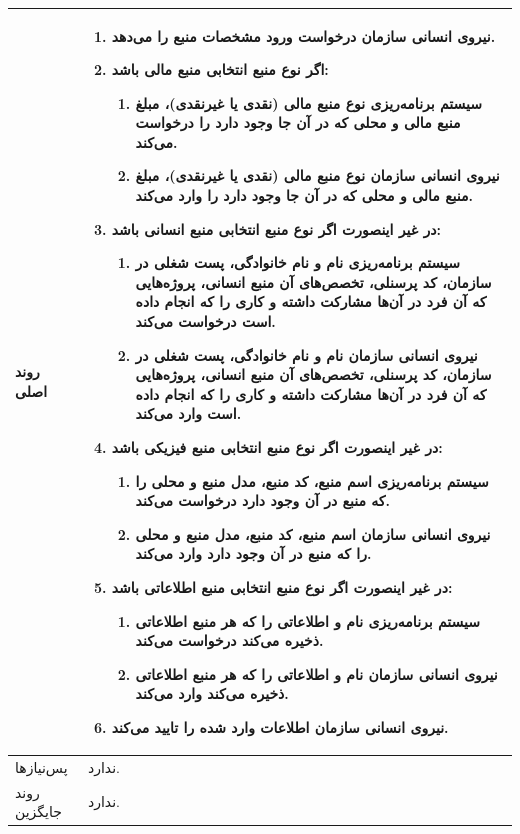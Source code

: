 \begin{table}[H]
\begin{tabular}{|p{3cm}|p{11cm}|}
		
		روند اصلی &
		\begin{enumerate}[topsep=0cm,leftmargin=0.5cm]
			\item نیروی انسانی سازمان درخواست ورود مشخصات منبع را می‌دهد.
			\item اگر نوع منبع انتخابی منبع مالی باشد:
			\begin{enumerate}[topsep=0cm,leftmargin=0.5cm]
				\item سیستم برنامه‌ریزی نوع منبع مالی (نقدی یا غیرنقدی)، مبلغ منبع مالی و محلی که در آن جا وجود دارد را درخواست می‌کند.
				\item نیروی انسانی سازمان نوع منبع مالی (نقدی یا غیرنقدی)، مبلغ منبع مالی و محلی که در آن جا وجود دارد را وارد می‌کند.
			\end{enumerate}
			\item در غیر اینصورت اگر نوع منبع انتخابی منبع انسانی باشد:
			\begin{enumerate}[topsep=0cm,leftmargin=0.5cm]
				\item سیستم برنامه‌ریزی نام و نام خانوادگی، پست شغلی در سازمان، کد پرسنلی، تخصص‌های آن منبع انسانی، پروژه‌هایی که آن فرد در آن‌ها مشارکت داشته و کاری را که انجام داده است درخواست می‌کند.
				\item نیروی انسانی سازمان نام و نام خانوادگی، پست شغلی در سازمان، کد پرسنلی، تخصص‌های آن منبع انسانی، پروژه‌هایی که آن فرد در آن‌ها مشارکت داشته و کاری را که انجام داده است وارد می‌کند.
			\end{enumerate}
			\item در غیر اینصورت اگر نوع منبع انتخابی منبع فیزیکی باشد:
			\begin{enumerate}[topsep=0cm,leftmargin=0.5cm]
				\item  سیستم برنامه‌ریزی اسم منبع، کد منبع، مدل منبع و محلی را که منبع در آن وجود دارد درخواست می‌کند.
				\item نیروی انسانی سازمان اسم منبع، کد منبع، مدل منبع و محلی را که منبع در آن وجود دارد وارد می‌کند.
			\end{enumerate}
			\item در غیر اینصورت اگر نوع منبع انتخابی منبع اطلاعاتی باشد:
			\begin{enumerate}[topsep=0cm,leftmargin=0.5cm]
				\item سیستم برنامه‌ریزی نام و اطلاعاتی را که هر منبع اطلاعاتی ذخیره می‌کند درخواست می‌کند.
				\item نیروی انسانی سازمان نام و اطلاعاتی را که هر منبع اطلاعاتی ذخیره می‌کند وارد می‌کند.
			\end{enumerate}
			\item نیروی انسانی سازمان اطلاعات وارد شده را تایید می‌کند.
		\end{enumerate} \\
		\hline
		
		پس‌نیازها &
		ندارد. \\
		
		\hline
		روند جایگزین
		& ندارد. \\
		\hline
		
	\end{tabular}
\end{table}


